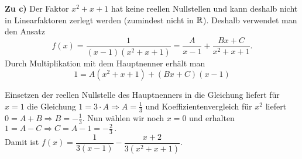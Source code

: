 {\bigskip
\textbf{Zu c)} Der Faktor $x^2+x+1$ hat keine reellen Nullstellen und kann deshalb nicht in Linearfaktoren zerlegt werden (zumindest nicht in $\mathbb{R}$). Deshalb verwendet man den Ansatz
$$ 
f(x)=\dfrac{1}{(x-1)(x^2+x+1)} = \dfrac{A}{x-1} + \dfrac{Bx+C}{x^2+x+1}. 
$$
Durch Multiplikation mit dem Hauptnenner erh\"alt man
\[ 1 = A(x^2+x+1)+(Bx+C)(x-1)\]

Einsetzen der reellen Nullstelle des Hauptnenners in die Gleichung liefert 
f\"ur \(x=1\) die Gleichung \(1 = 3\cdot A \Rightarrow A = \frac13\) und Koeffizientenvergleich f\"ur \(x^2\) liefert \(0 = A+B \Rightarrow B = -\frac13\). Nun w\"ahlen wir noch \(x = 0\) und erhalten \( 1=A-C  \Rightarrow C =A-1=-\frac23\,.\)\\

Damit ist
$f(x)= \dfrac{1}{3(x-1)}-\dfrac{x+2}{3(x^2+x+1)}$. 

}


% 




